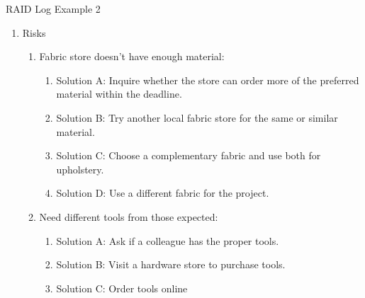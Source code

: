 \documentclass[aspectratio=169]{beamer}
\begin{document}
\begin{frame}{RAID Log Example 2}
    \begin{enumerate}
        \item Risks
        \begin{enumerate}
            \item Fabric store doesn't have enough material:
            \begin{enumerate}
                \item Solution A: Inquire whether the store can order more of the preferred material within the deadline.
                \item Solution B: Try another local fabric store for the same or similar material.
                \item Solution C: Choose a complementary fabric and use both for upholstery.
                \item Solution D: Use a different fabric for the project.
            \end{enumerate}
            \item Need different tools from those expected:
            \begin{enumerate}
                \item Solution A: Ask if a colleague has the proper tools.
                \item Solution B: Visit a hardware store to purchase tools.
                \item Solution C: Order tools online
            \end{enumerate}
        \end{enumerate}
    \end{enumerate}
\end{frame}
\end{document}
